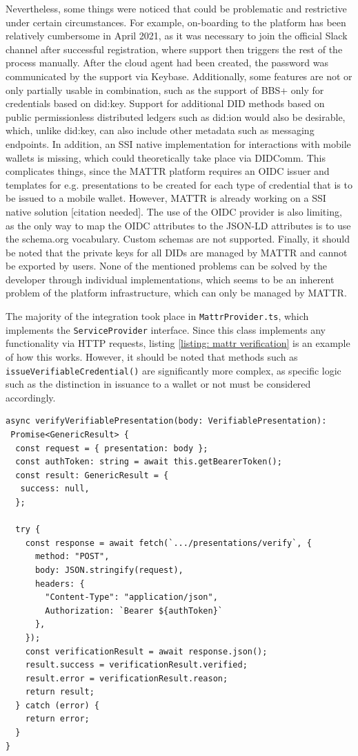     Nevertheless, some things were noticed that could be problematic and restrictive under certain circumstances. For example, on-boarding to the platform has been relatively cumbersome in April 2021, as it was necessary to join the official Slack channel after successful registration, where support then triggers the rest of the process manually. After the cloud agent had been created, the password was communicated by the support via Keybase. Additionally, some features are not or only partially usable in combination, such as the support of BBS+ only for credentials based on did:key. Support for additional DID methods based on public permissionless distributed ledgers such as did:ion would also be desirable, which, unlike did:key, can also include other metadata such as messaging endpoints. In addition, an SSI native implementation for interactions with mobile wallets is missing, which could theoretically take place via DIDComm. This complicates things, since the MATTR platform requires an OIDC issuer and templates for e.g. presentations to be created for each type of credential that is to be issued to a mobile wallet. However, MATTR is already working on a \ac{SSI} native solution [citation needed]. The use of the OIDC provider is also limiting, as the only way to map the OIDC attributes to the JSON-LD attributes is to use the schema.org vocabulary. Custom schemas are not supported. Finally, it should be noted that the private keys for all \acp{DID} are managed by MATTR and cannot be exported by users. None of the mentioned problems can be solved by the developer through individual implementations, which seems to be an inherent problem of the platform infrastructure, which can only be managed by MATTR.
    
    The majority of the integration took place in \texttt{MattrProvider.ts}, which implements the \texttt{ServiceProvider} interface. Since this class implements any functionality via HTTP requests, listing \ref{listing: mattr verification} is an example of how this works. However, it should be noted that methods such as \texttt{issueVerifiableCredential()} are significantly more complex, as specific logic such as the distinction in issuance to a wallet or not must be considered accordingly.
    \newline
    
\begin{lstlisting}[style=ES6, caption=Example of mattr verification implementation, label={listing: mattr verification}]
async verifyVerifiablePresentation(body: VerifiablePresentation): 
 Promise<GenericResult> {
  const request = { presentation: body };
  const authToken: string = await this.getBearerToken();
  const result: GenericResult = {
   success: null,
  };

  try {
    const response = await fetch(`.../presentations/verify`, {
      method: "POST",
      body: JSON.stringify(request),
      headers: { 
        "Content-Type": "application/json", 
        Authorization: `Bearer ${authToken}` 
      },
    });
    const verificationResult = await response.json();
    result.success = verificationResult.verified;
    result.error = verificationResult.reason;
    return result;
  } catch (error) {
    return error;
  }
}\end{lstlisting}
    
